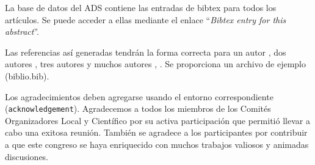 \documentclass[baaa]{baaa}
\begin{document}
La base de datos del ADS contiene las entradas de {\sc bibtex}  para todos los artículos.  Se puede acceder a ellas mediante el enlace ``{\em Bibtex entry for this abstract}''.

Las referencias así generadas tendrán la forma co\-rrec\-ta para un autor \citep{hubble_expansion_1929}, dos autores \citep{penzias_cmb_1965}, tres autores \citep{navarro_NFW_1997} y muchos autores \citep{riess_SN1a_1998}, \citep{Planck_2016}. Se proporciona un archivo de ejemplo (biblio.bib).

\begin{acknowledgement}
Los agradecimientos deben agregarse usando el entorno correspondiente (\texttt{acknowledgement}). Agradecemos a todos los miembros de los Comités Organizadores Local y Científico por su activa participación que permitió llevar a cabo una exitosa reunión. También se agradece a los participantes por contribuir a que este congreso se haya enriquecido con muchos trabajos valiosos y animadas discusiones.
\end{acknowledgement}



\small

 
\end{document}
